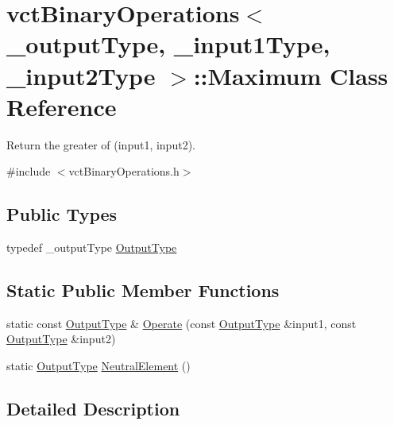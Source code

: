\hypertarget{classvct_binary_operations_1_1_maximum}{}\section{vct\+Binary\+Operations$<$ \+\_\+output\+Type, \+\_\+input1\+Type, \+\_\+input2\+Type $>$\+:\+:Maximum Class Reference}
\label{classvct_binary_operations_1_1_maximum}


Return the greater of (input1, input2).  




{\ttfamily \#include $<$vct\+Binary\+Operations.\+h$>$}

\subsection*{Public Types}
\begin{DoxyCompactItemize}
\item 
typedef \+\_\+output\+Type \hyperlink{classvct_binary_operations_1_1_maximum_abfe4fd3b0f4c1b3dc210114bff1e92dc}{Output\+Type}
\end{DoxyCompactItemize}
\subsection*{Static Public Member Functions}
\begin{DoxyCompactItemize}
\item 
static const \hyperlink{classvct_binary_operations_1_1_maximum_abfe4fd3b0f4c1b3dc210114bff1e92dc}{Output\+Type} \& \hyperlink{classvct_binary_operations_1_1_maximum_a8cb41e8e5bdea8ce5a56209cfb63a539}{Operate} (const \hyperlink{classvct_binary_operations_1_1_maximum_abfe4fd3b0f4c1b3dc210114bff1e92dc}{Output\+Type} \&input1, const \hyperlink{classvct_binary_operations_1_1_maximum_abfe4fd3b0f4c1b3dc210114bff1e92dc}{Output\+Type} \&input2)
\item 
static \hyperlink{classvct_binary_operations_1_1_maximum_abfe4fd3b0f4c1b3dc210114bff1e92dc}{Output\+Type} \hyperlink{classvct_binary_operations_1_1_maximum_ae66e4aca80b98858f63e15de140eb6b1}{Neutral\+Element} ()
\end{DoxyCompactItemize}


\subsection{Detailed Description}
